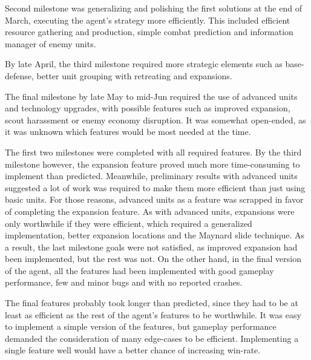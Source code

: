 Second milestone was generalizing and polishing the first solutions at the end of March, executing the agent's strategy more efficiently. This included efficient resource gathering and production, simple combat prediction and information manager of enemy units.

By late April, the third milestone required more strategic elements such as base-defense, better unit grouping with retreating and expansions.

The final milestone by late May to mid-Jun required the use of advanced units and technology upgrades, with possible features such as improved expansion, scout harassment or enemy economy disruption. It was somewhat open-ended, as it was unknown which features would be most needed at the time.

The first two milestones were completed with all required features. By the third milestone however, the expansion feature proved much more time-consuming to implement than predicted. Meanwhile, preliminary results with advanced units suggested a lot of work was required to make them more efficient than just using basic units. For those reasons, advanced units as a feature was scrapped in favor of completing the expansion feature. As with advanced units, expansions were only worthwhile if they were efficient, which required a generalized implementation, better expansion locations and the Maynard slide technique. As a result, the last milestone goals were not satisfied, as improved expansion had been implemented, but the rest was not. On the other hand, in the final version of the agent, all the features had been implemented with good gameplay performance, few and minor bugs and with no reported crashes.

The final features probably took longer than predicted, since they had to be at least as efficient as the rest of the agent's features to be worthwhile. It was easy to implement a simple version of the features, but gameplay performance demanded the consideration of many edge-cases to be efficient. Implementing a single feature well would have a better chance of increasing win-rate.